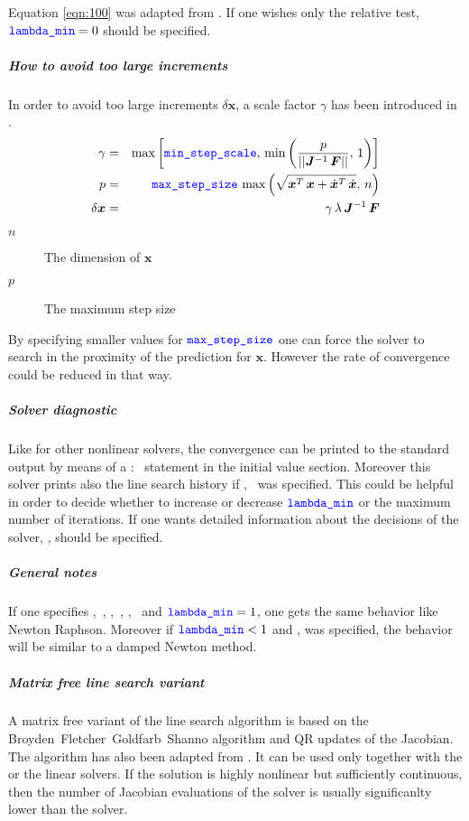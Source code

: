 Equation \ref{eqn:100} was adapted from \cite{NUMERICAL-RECIPES-IN-C}.
If one wishes only the relative test, $\textcolor{blue}{\texttt{lambda\_min}}=0$ should be specified.

\subparagraph{How to avoid too large increments}
In order to avoid too large increments $\delta\boldsymbol{x}$, a scale factor $\gamma$ has been introduced in \cite{NUMERICAL-RECIPES-IN-C}.
\begin{eqnarray}
\gamma &=& \max{\left[\textcolor{blue}{\texttt{min\_step\_scale}}, \, \min{\left(\frac{p}{\left|\left| \boldsymbol{J}^{-1} \, \boldsymbol{F} \right|\right|},\, 1\right)}\right]} \\ \nonumber
p &=& \textcolor{blue}{\texttt{max\_step\_size}} \, \max{\left(\sqrt{\boldsymbol{x}^T\,\boldsymbol{x} + \dot{\boldsymbol{x}}^T\,\dot{\boldsymbol{x}}},\, n\right)} \\ \nonumber
\delta\boldsymbol{x}&=&\gamma\,\lambda\,\boldsymbol{J}^{-1}\,\boldsymbol{F}
\end{eqnarray}

\begin{description}
\item[$n$] The dimension of $\boldsymbol{x}$
\item[$p$] The maximum step size
\end{description}

By specifying smaller values for $\textcolor{blue}{\texttt{max\_step\_size}}$ one can force the solver to search in the proximity of the prediction for $\boldsymbol{x}$. However the rate of convergence could be reduced in that way.

\subparagraph{Solver diagnostic}
Like for other nonlinear solvers, the convergence can be printed to the standard output by means of a :~ statement in the initial value section. Moreover this solver prints also the line search history if ,~ was specified. This could be helpful in order to decide whether to increase or decrease $\textcolor{blue}{\texttt{lambda\_min}}$ or the maximum number of iterations. If one wants detailed information about the decisions of the solver, ,  should be specified.

\subparagraph{General notes}
If one specifies ,~, ,~, ,~ and $\textcolor{blue}{\texttt{lambda\_min}}=1$, one gets the same behavior like Newton Raphson. Moreover if $\textcolor{blue}{\texttt{lambda\_min}}<1$ and ,  was specified, the behavior will be similar to a damped Newton method.

\subparagraph{Matrix free line search variant}
A matrix free variant of the line search algorithm is based on the Broyden~Fletcher~Goldfarb~Shanno
algorithm and QR updates of the Jacobian. The  algorithm has also been adapted from \cite{NUMERICAL-RECIPES-IN-C}.
It can be used only together with the  or the  linear solvers. If the solution is highly nonlinear but
sufficiently continuous, then the number of Jacobian evaluations of the  solver is usually significanlty lower
than the  solver.


